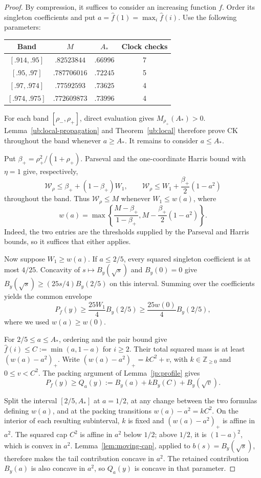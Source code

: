 \documentclass[11pt,letterpaper]{amsart}
\newcommand{\1}{\mathbf 1}
\numberwithin{equation}{section}
\begin{document}
\begin{proof}
By compression, it suffices to consider an increasing function $f$.
Order its singleton coefficients and put
$a=\widehat f(1)=\max_i\widehat f(i)$.
Use the following parameters:
\begin{center}\normalsize
\begin{tabular}{@{}cccc@{}}
\toprule
Band & $M$ & $A_*$ & Clock checks\\
\midrule
$[.914,.95]$ & $.82523844$ & $.66996$ & 7\\
$[.95,.97]$ & $.787706016$ & $.72245$ & 5\\
$[.97,.974]$ & $.77592593$ & $.73625$ & 4\\
$[.974,.975]$ & $.772609873$ & $.73996$ & 4\\
\bottomrule
\end{tabular}
\end{center}

For each band $[\rho_-,\rho_+]$, direct evaluation gives
$M_{\rho_+}(A_*)>0$.
Lemma~\ref{ub:local-propagation} and Theorem~\ref{ub:local}
therefore prove CK throughout the band whenever $a\ge A_*$.
It remains to consider $a\le A_*$.

Put $\beta_+=\rho_+^2/(1+\rho_+)$.
Parseval and the one-coordinate Harris bound with $\eta=1$
give, respectively,
\[
 \mathcal W_\rho\le\beta_++(1-\beta_+)W_1,
 \qquad
 \mathcal W_\rho\le W_1+\frac{\beta_+}{2}(1-a^2)
\]
throughout the band.
Thus $\mathcal W_\rho\le M$ whenever $W_1\le w(a)$, where
\[
 w(a)=\max\left\{
       \frac{M-\beta_+}{1-\beta_+},
       M-\frac{\beta_+}{2}(1-a^2)
       \right\}.
\]
Indeed, the two entries are the thresholds supplied by the
Parseval and Harris bounds, so it suffices that either applies.

Now suppose $W_1\ge w(a)$.
If $a\le2/5$, every squared singleton coefficient is at most
$4/25$.
Concavity of $s\mapsto B_y(\sqrt s)$ and $B_y(0)=0$ give
$B_y(\sqrt s)\ge(25s/4)B_y(2/5)$ on this interval.
Summing over the coefficients yields the common envelope
\[
 P_f(y)\ge\frac{25W_1}{4}B_y(2/5)
 \ge\frac{25w(0)}4B_y(2/5),
\]
where we used $w(a)\ge w(0)$.

For $2/5\le a\le A_*$, ordering and the pair bound give
$\widehat f(i)\le C:=\min(a,1-a)$ for $i\ge2$.
Their total squared mass is at least $(w(a)-a^2)_+$.
Write
$(w(a)-a^2)_+=kC^2+v$, with
$k\in\mathbb Z_{\ge0}$ and $0\le v<C^2$.
The packing argument of Lemma~\ref{jp:profile} gives
\[
 P_f(y)\ge Q_a(y)
 :=B_y(a)+kB_y(C)+B_y(\sqrt v).
\]

Split the interval $[2/5,A_*]$ at $a=1/2$, at any change
between the two formulas defining $w(a)$, and at the packing
transitions $w(a)-a^2=kC^2$.
On the interior of each resulting subinterval, $k$ is fixed
and $(w(a)-a^2)_+$ is affine in $a^2$.
The squared cap $C^2$ is affine in $a^2$ below $1/2$;
above $1/2$, it is $(1-a)^2$, which is convex in $a^2$.
Lemma~\ref{lem:moving-cap}, applied to
$b(s)=B_y(\sqrt s)$, therefore makes the tail contribution
concave in $a^2$.
The retained contribution $B_y(a)$ is also concave in $a^2$,
so $Q_a(y)$ is concave in that parameter.


\end{proof}
\end{document}
